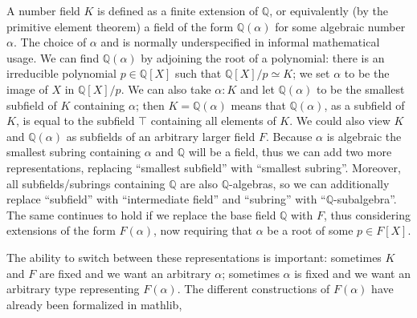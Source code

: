 \documentclass[a4paper,USenglish,cleveref, autoref, thm-restate]{lipics-v2021}
\newcommand{\lean}[1]{\texttt{#1}\xspace} %
\newcommand{\mathlib}{\textsf{mathlib}\xspace}
\newcommand{\Q}{\mathbb{Q}}
\begin{document}
A number field $K$ is defined as a finite extension of $\Q$, or equivalently (by the primitive element theorem) a field of the form $\Q(\alpha)$ for some algebraic number $\alpha$. 
The choice of $\alpha$ and is normally underspecified in informal mathematical usage. We can find $\Q(\alpha)$ by adjoining the root of a polynomial: there is an irreducible polynomial $p \in \Q[X]$ such that $\Q[X] / p \simeq K$; we set $\alpha$ to be the image of $X$ in $\Q[X] / p$.
We can also take $\alpha : K$ and let $\Q(\alpha)$ to be the smallest subfield of $K$ containing $\alpha$; %
then $K = \Q(\alpha)$ means that $\Q(\alpha)$, as a subfield of $K$, is equal to the subfield $\top$ containing all elements of $K$.
We could also view $K$ and $\Q(\alpha)$ as subfields of an arbitrary larger field $F$.
Because $\alpha$ is algebraic the smallest subring containing $\alpha$ and $\Q$ will be a field, thus we can add two more representations, replacing ``smallest subfield'' with ``smallest subring''.
Moreover, all subfields/subrings containing $\Q$ are also $\Q$-algebras, so we can additionally replace ``subfield'' with ``intermediate field'' and ``subring'' with ``$\Q$-subalgebra''. The same continues to hold if we replace the base field $\Q$ with $F$, thus considering extensions of the form $F(\alpha)$, now requiring that $\alpha$ be a root of some $p\in F[X]$.

The ability to switch between these representations is important: sometimes $K$ and $F$ are fixed and we want an arbitrary $\alpha$; sometimes $\alpha$ is fixed and we want an arbitrary type representing $F(\alpha)$. The different constructions of $F(\alpha)$ have already been formalized in \mathlib,
\end{document}
